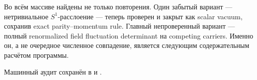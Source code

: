 \begin{theorem}
Во всём массиве найдены не только повторения. Один забытый вариант ---
нетривиальное \(S^1\)-расслоение --- теперь проверен и закрыт как scalar
vacuum, сохранив exact parity--momentum rule. Главный непроверенный вариант
--- полный renormalized field fluctuation determinant на competing
carriers. Именно он, а не очередное численное совпадение, является следующим
содержательным расчётом программы.
\end{theorem}

Машинный аудит сохранён в
 и
.